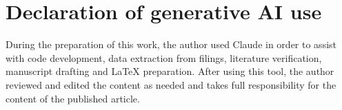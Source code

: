 \documentclass[11pt,letterpaper]{article}
\begin{document}
\section*{Declaration of generative AI use}
During the preparation of this work, the author used Claude in order to assist with
code development, data extraction from filings, literature verification, manuscript
drafting and LaTeX preparation. After using this tool, the author reviewed and edited
the content as needed and takes full responsibility for the content of the published
article.

\begingroup
\small
\setlength{\bibsep}{4pt}

\endgroup


\end{document}
